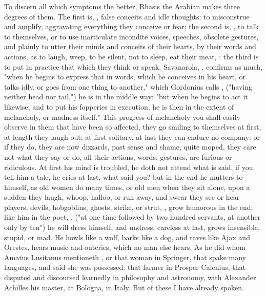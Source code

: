 {To discern all which symptoms the better, Rhasis the
Arabian makes three degrees of them. The first is, , false
conceits and idle thoughts: to misconstrue and amplify, aggravating everything
they conceive or fear; the second is, , to talk to
themselves, or to use inarticulate incondite voices, speeches, obsolete
gestures, and plainly to utter their minds and conceits of their hearts, by
their words and actions, as to laugh, weep, to be silent, not to sleep, eat
their meat, \etc{}: the third is to put in practice that
which they think or speak. Savanarola, , confirms as much, "when he
begins to express that in words, which he conceives in his heart, or talks
idly, or goes from one thing to another," which Gordonius
calls , ("having neither head nor tail,") he
is in the middle way: "but when he begins to act it
likewise, and to put his fopperies in execution, he is then in the extent of
melancholy, or madness itself." This progress of melancholy you shall easily
observe in them that have been so affected, they go smiling to themselves at
first, at length they laugh out; at first solitary, at last they can endure no
company: or if they do, they are now dizzards, past sense and shame, quite
moped, they care not what they say or do, all their actions, words, gestures,
are furious or ridiculous. At first his mind is troubled, he doth not attend
what is said, if you tell him a tale, he cries at last, what said you? but in
the end he mutters to himself, as old women do many times, or old men when they
sit alone, upon a sudden they laugh, whoop, halloo, or run away, and swear they
see or hear players, devils, hobgoblins, ghosts, strike,
or strut, \etc{}, grow humorous in the end; like him in the poet, , ("at one time followed by two hundred servants,
at another only by ten") he will dress himself, and undress, careless at last,
grows insensible, stupid, or mad. He howls like a wolf,
barks like a dog, and raves like Ajax and Orestes, hears music and outcries,
which no man else hears. As he did whom Amatus Lusitanus
mentioneth , or that woman in
Springer, that spake many languages, and said she was
possessed: that farmer in Prosper Calenius, that disputed
and discoursed learnedly in philosophy and astronomy, with Alexander Achilles
his master, at Bologna, in Italy. But of these I have already spoken.

}
